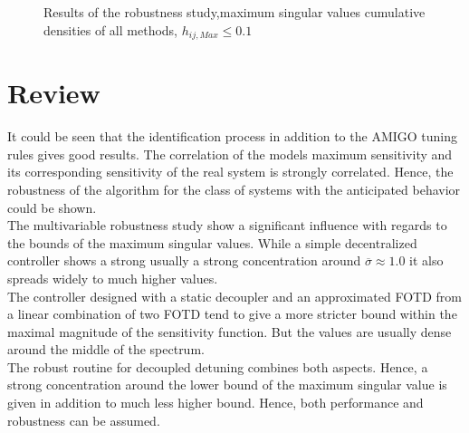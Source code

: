 \begin{figure}[H]\centering

\caption{Results of the robustness study,maximum singular values cumulative densities of all methods, $h_{ij,Max} \leq 0.1$}
\label{c:montecarlo:f:mimo_cdf_detuned_poles}
\end{figure}

\section{Review}
\label{c:montecarlo:s:review}

It could be seen that the identification process in addition to the AMIGO tuning rules gives good results. The correlation of the models maximum sensitivity and its corresponding sensitivity of the real system is strongly correlated. Hence, the robustness of the algorithm for the class of systems with the anticipated behavior could be shown.\\

The multivariable robustness study show a significant influence with regards to the bounds of the maximum singular values. While a simple decentralized controller shows a strong usually a strong concentration around $\overline{\sigma} \approx 1.0$ it also spreads widely to much higher values.\\

The controller designed with a static decoupler and an approximated FOTD from a linear combination of two FOTD tend to give a more stricter bound within the maximal magnitude of the sensitivity function. But the values are usually dense around the middle of the spectrum.\\

The robust routine for decoupled detuning combines both aspects. Hence, a strong concentration around the lower bound of the maximum singular value is given in addition to much less higher bound. Hence, both performance and robustness can be assumed.\\